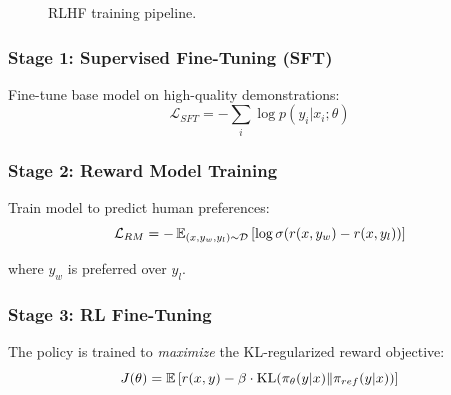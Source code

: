 \begin{figure}[H]
\centering
{}
\caption{RLHF training pipeline.}
\label{fig:rlhf_pipeline_overview}
\end{figure}

\subsubsection{Stage 1: Supervised Fine-Tuning (SFT)}

Fine-tune base model on high-quality demonstrations:
\begin{equation}
\mathcal{L}_{SFT} = -\sum_i \log p(y_i | x_i; \theta)
\end{equation}

\subsubsection{Stage 2: Reward Model Training}

Train model to predict human preferences:
\begin{equation}
\mathcal{L}_{RM} = -\operatorname{\mathbb{E}}_{(x, y_w, y_l) \sim \mathcal{D}}\left[\log \sigma(r(x, y_w) - r(x, y_l))\right]
\end{equation}

where $y_w$ is preferred over $y_l$.

\subsubsection{Stage 3: RL Fine-Tuning}

The policy is trained to \emph{maximize} the KL-regularized reward objective:
\begin{equation}
J(\theta) = \operatorname{\mathbb{E}}\left[r(x, y) - \beta \cdot \text{KL}(\pi_\theta(y|x) \| \pi_{ref}(y|x))\right]
\end{equation}


